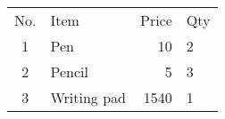 \documentclass{article}
\begin{document}
	\begin{tabular}{cp{4cm}rl}
		No. & Item & Price & Qty \\
		1 & Pen & 10 & 2 \\
		2 & Pencil & 5 & 3 \\
		3 & Writing pad & 1540 & 1 \\
	\end{tabular}
\end{document}

